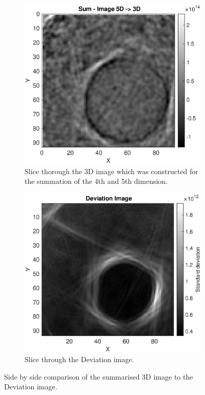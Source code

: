 \begin{figure}[H]
     \centering
     \begin{subfigure}[b]{0.47\textwidth}
         \centering
        \includegraphics[width=1.09\linewidth]{Graphics/Results/Variance_Image/Variance_Ortho_slice_87_compare_5d_to_3d.eps}
         \caption{Slice thorough the 3D image which was constructed for the summation of the 4th and 5th dimension. }
         \label{fig:res:compare_normal_variance_normal}
     \end{subfigure}
     \hfill
     \begin{subfigure}[b]{0.47\textwidth}
         \centering
         \includegraphics[width=1.13\textwidth]{Graphics/Results/Variance_Image/Variance_Ortho_slice_87.eps}
         \caption{Slice through the Deviation image. }
         \label{fig:res:compare_normal_variance_variance}
     \end{subfigure}
        \caption{Side by side comparison of the summarised 3D image to the Deviation image.}
        \label{fig:res:compare_normal_variance}
\end{figure}


